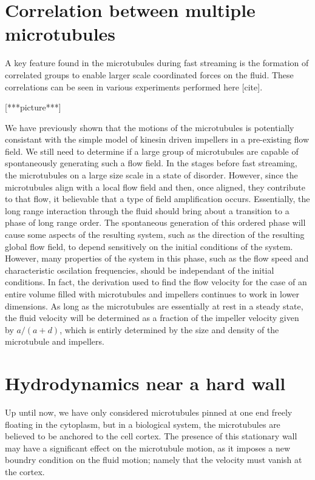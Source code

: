 \documentclass[11pt]{ucthesis}
\begin{document}
{\section{Correlation between multiple microtubules}
A key feature found in the microtubules during fast streaming is the formation of correlated groups to enable larger scale coordinated forces on the fluid. These correlations can be seen in various experiments performed here [cite].

[***picture***]

We have previously shown that the motions of the microtubules is potentially consistant with the simple model of kinesin driven impellers in a pre-existing flow field. We still need to determine if a large group of microtubules are capable of spontaneously generating such a flow field.
In the stages before fast streaming, the microtubules on a large size scale in a state of disorder. However, since the microtubules align with a local flow field and then, once aligned, they contribute to that flow, it believable that a type of field amplification occurs.
Essentially, the long range interaction through the fluid should bring about a transition to a phase of long range order.
The spontaneous generation of this ordered phase will cause some aspects of the resulting system, such as the direction of the resulting global flow field, to depend sensitively on the initial conditions of the system.
However, many properties of the system in this phase, such as the flow speed and characteristic oscilation frequencies, should be independant of the initial conditions.
In fact, the derivation used to find the flow velocity for the case of an entire volume filled with microtubules and impellers continues to work in lower dimensions.
As long as the microtubules are essentially at rest in a steady state, the fluid velocity will be determined as a fraction of the impeller velocity given by $a/(a+d)$, which is entirly determined by the size and density of the microtubule and impellers.

\section{Hydrodynamics near a hard wall}
Up until now, we have only considered microtubules pinned at one end freely floating in the cytoplasm, but in a biological system, the microtubules are believed to be anchored to the cell cortex. 
The presence of this stationary wall may have a significant effect on the microtubule motion, as it imposes a new boundry condition on the fluid motion; namely that the velocity must vanish at the cortex.


}
\end{document}
